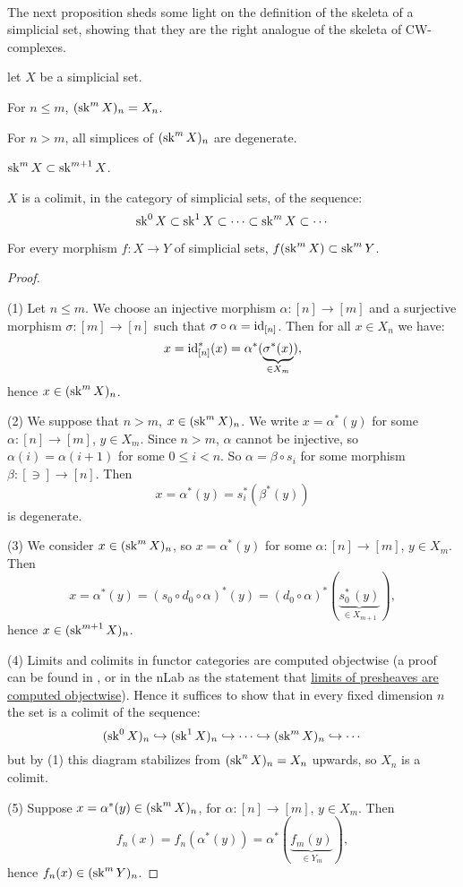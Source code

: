 
\ 


The next proposition sheds some light on the definition of the skeleta of a simplicial set, showing that they are the right analogue of the skeleta of CW-complexes.

\begin{proposition}\label{proposition:getting-to-know-the-simplicial-skeleton}
let $X$ be a simplicial set.
\begin{numerate}
\item For $n\le m$, $(\operatorname{sk}^m X)_n=X_n$.
\item For $n>m$, all simplices of $(\operatorname{sk}^m X)_n$ are degenerate.
\item $\operatorname{sk}^m X\subset \operatorname{sk}^{m+1} X$.
\item $X$ is a colimit, in the category of simplicial sets, of the sequence:
\[\operatorname{sk}^0 X\subset \operatorname{sk}^1 X\subset\cdots\subset \operatorname{sk}^m X\subset\cdots\]
\item For every morphism $f:X\to Y$ of simplicial sets, $f(\operatorname{sk}^m X)\subset\operatorname{sk}^m Y$.
\end{numerate}
\end{proposition}

\begin{proof}\ 

(1) Let $n\le m$. We choose an injective morphism $\alpha:[n]\to[m]$ and a surjective morphism $\sigma:[m]\to[n]$ such that $\sigma\circ\alpha=\operatorname{id}_{[n]}$. Then for all $x\in X_n$ we have:
\[x=\operatorname{id}_{[n]}^*(x)=\alpha^*(\underbrace{\sigma^*(x)}_{\in X_m}),\]
hence $x\in(\operatorname{sk}^m X)_n$.

(2) We suppose that $n>m$, $x\in (\operatorname{sk}^m X)_n$. We write $x=\alpha^*(y)$ for some $\alpha:[n]\to[m]$, $y\in X_m$. Since $n>m$, $\alpha$ cannot be injective, so $\alpha(i)=\alpha(i+1)$ for some $0\le i<n$. So $\alpha=\beta\circ s_i$ for some morphism $\beta:[\ni]\to[n]$. Then
\[x=\alpha^*(y)=s_i^*(\beta^*(y))\]
is degenerate.

(3) We consider $x\in(\operatorname{sk}^m X)_n$, so $x=\alpha^*(y)$ for some $\alpha:[n]\to[m]$, $y\in X_m$. Then
\[x=\alpha^*(y)=(s_0\circ d_0\circ\alpha)^*(y)=(d_0\circ\alpha)^*(\underbrace{s_0^*\,(y)}_{\in X_{m+1}}),\]
hence $x\in(\operatorname{sk}^{m+1} X)_n$.

(4) Limits and colimits in functor categories are computed objectwise (a proof can be found in \cite[theorem V.5.1]{maclane:71}, or in the nLab as the statement that \href{http://nlab-pages.s3.us-east-2.amazonaws.com/nlab/show/limits+of+presheaves+are+computed+objectwise}{limits of presheaves are computed objectwise}). Hence it suffices to show that in every fixed dimension $n$ the set is a colimit of the sequence:
\[(\operatorname{sk}^0 X)_n\hookrightarrow (\operatorname{sk}^1 X)_n\hookrightarrow\cdots\hookrightarrow (\operatorname{sk}^m X)_n\hookrightarrow\cdots\]
but by (1) this diagram stabilizes from $(\operatorname{sk}^n X)_n=X_n$ upwards, so $X_n$ is a colimit.

(5) Suppose $x=\alpha^*(y)\in(\operatorname{sk}^m X)_n$, for $\alpha:[n]\to[m]$, $y\in X_m$. Then
\[f_n(x)=f_n(\alpha^*(y))=\alpha^*(\underbrace{f_m(y)}_{\in Y_m}),\]
hence $f_n(x)\in(\operatorname{sk}^m Y)_n$.
\end{proof}

